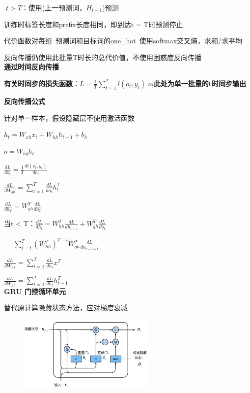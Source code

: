 \documentclass[UTF8]{ctexart}
\begin{document}
  \quad {}.$t > T$：使用(上一预测词，$H_{t-1}$)预测

  \quad \quad \quad 训练时标签长度和prefix长度相同，即到达t = T时预测停止
  
  \quad \quad 代价函数对每组\ 预测词和目标词的one\_hot\ 使用softmax交叉熵，求和/求平均
  
  \quad \quad \quad 反向传播仍使用此批量T时长的总代价值，不使用困惑度反向传播\\
\textbf{通过时间反向传播}

  \textbf{有关时间步的损失函数}：$L = \frac{1}{T}\sum_{t = 1}^{T} l(o_t, y_t) $ \textbf{$o_t$此处为单一批量的t时间步输出}

  \textbf{反向传播公式} 
  
  \quad 针对单一样本，假设隐藏层不使用激活函数

  \quad \quad $h_t = W_{xh}x_t + W_{hh}h_{t-1} + b_h$

  \quad \quad $o = W_{hq}h_t$
  
  \quad $\frac{d L}{d o_t} = \frac{1}{T}\frac{d l(o_t, y_t)}{d o_t}$
  
  \quad $\frac{d L}{d W_{qh}} = \sum_{t=1}^{T}\frac{d L}{d o_t}h_t^T$
  
  \quad $\frac{d L}{d h_T} = W_{qh}^T\frac{d L}{d o_T}$
  
  \quad 当t < T：$\frac{d L}{d h_t} = W_{hh}^T\frac{d L}{d h_{t+1}} + W_{qh}^T\frac{d L}{d o_t}$
  
  \quad \quad $ = \sum_{i=t}^{T}(W_{hh}^T)^{T - i}W_{qh}^T\frac{d L}{d o_{T - i + t}}$
  
  \quad $\frac{d L}{d W_{hx}} = \sum_{t=1}^{T}\frac{d L}{d h_t}x^T$
  
  \quad $\frac{d L}{d W_{hh}} = \sum_{t=1}^{T}\frac{d L}{d h_t}h_{t-1}^T$\\
\textbf{GRU 门控循环单元}

  替代原计算隐藏状态方法，应对梯度衰减
  \begin{figure}[H] %
    \centering %
    \includegraphics[width=0.6\textwidth]{note_images/GRU.png} %
  \end{figure}
\end{document}
